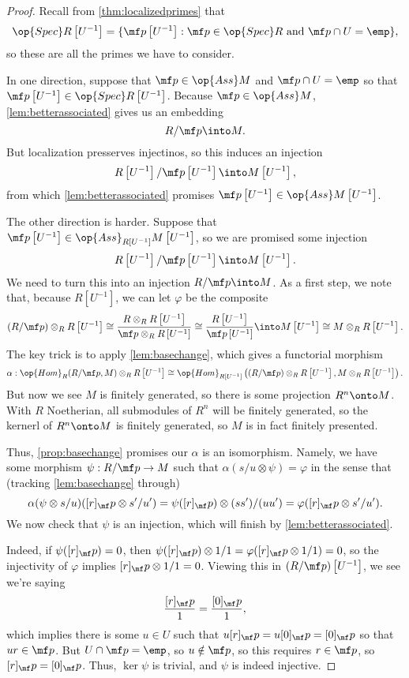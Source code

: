 \begin{proof}
	Recall from \autoref{thm:localizedprimes} that
	\[\op{Spec}R\left[U^{-1}\right]=\{\mf p\left[U^{-1}\right]:\mf p\in\op{Spec}R\text{ and }\mf p\cap U=\emp\},\]
	so these are all the primes we have to consider.
	
	In one direction, suppose that $\mf p\in\op{Ass}M$ and $\mf p\cap U=\emp$ so that $\mf p\left[U^{-1}\right]\in\op{Spec}R\left[U^{-1}\right]$. Because $\mf p\in\op{Ass}M$, \autoref{lem:betterassociated} gives us an embedding
	\[R/\mf p\into M.\]
	But localization presserves injectinos, so this induces an injection
	\[R\left[U^{-1}\right]/\mf p\left[U^{-1}\right]\into M\left[U^{-1}\right],\]
	from which \autoref{lem:betterassociated} promises $\mf p\left[U^{-1}\right]\in\op{Ass}M\left[U^{-1}\right]$.

	The other direction is harder. Suppose that $\mf p\left[U^{-1}\right]\in\op{Ass}_{R\left[U^{-1}\right]}M\left[U^{-1}\right]$, so we are promised some injection
	\[R\left[U^{-1}\right]/\mf p\left[U^{-1}\right]\into M\left[U^{-1}\right].\]
	We need to turn this into an injection $R/\mf p\into M$. As a first step, we note that, because $R\left[U^{-1}\right]$, we can let $\varphi$ be the composite
	\[(R/\mf p)\otimes_RR\left[U^{-1}\right]\cong\frac{R\otimes_RR\left[U^{-1}\right]}{\mf p\otimes_RR\left[U^{-1}\right]}\cong\frac{R\left[U^{-1}\right]}{\mf p\left[U^{-1}\right]}\into M\left[U^{-1}\right]\cong M\otimes_RR\left[U^{-1}\right].\]
	The key trick is to apply \autoref{lem:basechange}, which gives a functorial morphism
	\[\alpha:\op{Hom}_R(R/\mf p,M)\otimes_RR\left[U^{-1}\right]\cong\op{Hom}_{R\left[U^{-1}\right]}\left((R/\mf p)\otimes_RR\left[U^{-1}\right],M\otimes_RR\left[U^{-1}\right]\right).\]
	But now we see $M$ is finitely generated, so there is some projection $R^n\onto M$. With $R$ Noetherian, all submodules of $R^n$ will be finitely generated, so the kernerl of $R^n\onto M$ is finitely generated, so $M$ is in fact finitely presented.
	
	Thus, \autoref{prop:basechange} promises our $\alpha$ is an isomorphism. Namely, we have some morphism $\psi:R/\mf p\to M$ such that $\alpha(s/u\otimes\psi)=\varphi$ in the sense that (tracking \autoref{lem:basechange} through)
	\[\alpha(\psi\otimes s/u)([r]_\mf p\otimes s'/u')=\psi([r]_\mf p)\otimes(ss')/(uu')=\varphi([r]_\mf p\otimes s'/u').\]
	We now check that $\psi$ is an injection, which will finish by \autoref{lem:betterassociated}.
	
	Indeed, if $\psi([r]_\mf p)=0$, then $\psi([r]_\mf p)\otimes1/1=\varphi([r]_\mf p\otimes1/1)=0$, so the injectivity of $\varphi$ implies $[r]_\mf p\otimes1/1=0$. Viewing this in $(R/\mf p)\left[U^{-1}\right]$, we see we're saying
	\[\frac{[r]_\mf p}1=\frac{[0]_\mf p}1,\]
	which implies there is some $u\in U$ such that $u[r]_\mf p=u[0]_\mf p=[0]_\mf p$ so that $ur\in\mf p$. But $U\cap\mf p=\emp$, so $u\notin\mf p$, so this requires $r\in\mf p$, so $[r]_\mf p=[0]_\mf p$. Thus, $\ker\psi$ is trivial, and $\psi$ is indeed injective.
\end{proof}
